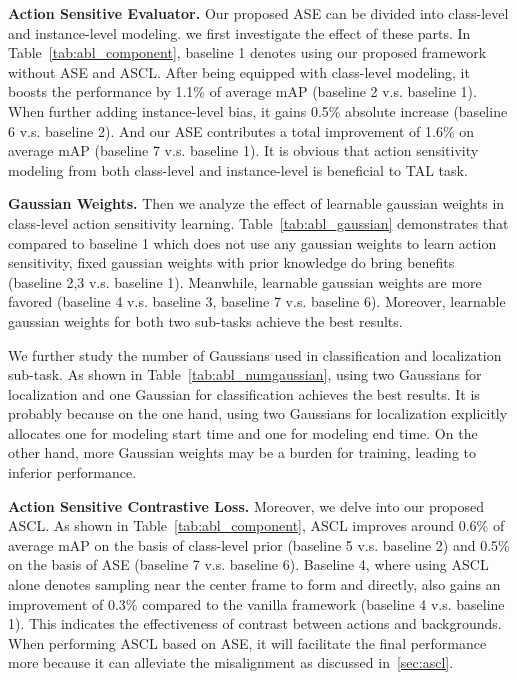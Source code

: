 \documentclass[10pt,twocolumn,letterpaper]{article}
\begin{document}
 \textbf{Action Sensitive Evaluator.}  Our proposed ASE can be divided into class-level and instance-level modeling. we first investigate the effect of these parts. In Table~\ref{tab:abl_component}, baseline 1 denotes using our proposed framework without ASE and ASCL. After being equipped with class-level modeling, it boosts the performance by 1.1\% of average mAP (baseline 2 v.s. baseline 1). When further adding instance-level bias, it gains 0.5\% absolute increase (baseline 6 v.s. baseline 2). And our ASE contributes a total improvement of 1.6\% on average mAP (baseline 7 v.s. baseline 1). It is obvious that action sensitivity modeling from both class-level and instance-level is beneficial to TAL task.

\textbf{Gaussian Weights.} Then we analyze the effect of learnable gaussian weights in class-level action sensitivity learning. Table~\ref{tab:abl_gaussian} demonstrates that compared to baseline 1 which does not use any gaussian weights to learn action sensitivity, fixed gaussian weights with prior knowledge do bring benefits (baseline 2,3 v.s. baseline 1). Meanwhile, learnable gaussian weights are more favored (baseline 4 v.s. baseline 3, baseline 7 v.s. baseline 6). Moreover, learnable gaussian weights for both two sub-tasks achieve the best results. 
\par We further study the number of Gaussians used in classification and localization sub-task. As shown in Table~\ref{tab:abl_numgaussian}, using two Gaussians for localization and one Gaussian for classification achieves the best results. It is probably because on the one hand, using two Gaussians for localization explicitly allocates one for modeling start time and one for modeling end time. On the other hand, more Gaussian weights may be a burden for training, leading to inferior performance. 



\textbf{Action Sensitive Contrastive Loss.} Moreover, we delve into our proposed ASCL. As shown in Table~\ref{tab:abl_component}, ASCL improves around 0.6\% of average mAP on the basis of class-level prior (baseline 5 v.s. baseline 2) and 0.5\% on the basis of ASE (baseline 7 v.s. baseline 6). Baseline 4, where using ASCL alone denotes sampling near the center frame to form  and  directly, also gains an improvement of 0.3\% compared to the vanilla framework (baseline 4 v.s. baseline 1). This indicates the effectiveness of contrast between actions and backgrounds. When performing ASCL based on ASE, it will facilitate the final performance more because it can alleviate the misalignment as discussed in~\ref{sec:ascl}.
\end{document}
